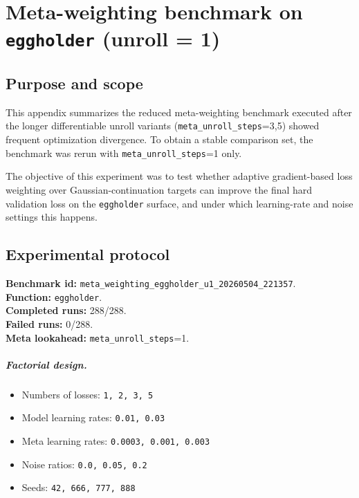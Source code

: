 \chapter{Meta-weighting benchmark on \texttt{eggholder} (unroll = 1)}
\label{app:meta-weighting-eggholder-u1}

\section{Purpose and scope}

This appendix summarizes the reduced meta-weighting benchmark executed after the
longer differentiable unroll variants (\texttt{meta\_unroll\_steps}=3,5)
showed frequent optimization divergence. To obtain a stable comparison set, the
benchmark was rerun with \texttt{meta\_unroll\_steps}=1 only.

The objective of this experiment was to test whether adaptive gradient-based
loss weighting over Gaussian-continuation targets can improve the final hard
validation loss on the \texttt{eggholder} surface, and under which learning-rate
and noise settings this happens.

\section{Experimental protocol}

\textbf{Benchmark id:} \texttt{meta\_weighting\_eggholder\_u1\_20260504\_221357}.\\
\textbf{Function:} \texttt{eggholder}.\\
\textbf{Completed runs:} 288/288.\\
\textbf{Failed runs:} 0/288.\\
\textbf{Meta lookahead:} \texttt{meta\_unroll\_steps}=1.

\paragraph{Factorial design.}
\begin{itemize}
    \item Numbers of losses: \texttt{1, 2, 3, 5}
    \item Model learning rates: \texttt{0.01, 0.03}
    \item Meta learning rates: \texttt{0.0003, 0.001, 0.003}
    \item Noise ratios: \texttt{0.0, 0.05, 0.2}
    \item Seeds: \texttt{42, 666, 777, 888}
\end{itemize}

